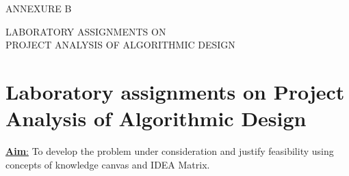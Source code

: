 \documentclass[12pt,a4paper]
{article}
\numberwithin{table}{section}
\begin{document}
{{{{{{{{{\begin{appendices}






\newpage
\begin{minipage}{15cm}


\vspace{4 in}
 \begin{center} 
\begin{Huge}

ANNEXURE B

\vspace{0.5 in}
\setlength{\baselineskip}{1\baselineskip}
{ LABORATORY ASSIGNMENTS ON \\
PROJECT ANALYSIS OF ALGORITHMIC DESIGN \\}
\end{Huge}

\end{center}
\end{minipage}


\newpage
\section{Laboratory assignments on Project Analysis of Algorithmic Design}


{\large \underline{\textbf{Aim}:}}  {To develop the problem under consideration and justify 
feasibility using concepts of knowledge canvas and IDEA Matrix}. 

\textunderscore \textunderscore \textunderscore \textunderscore 
\textunderscore \textunderscore \textunderscore \textunderscore 
\textunderscore \textunderscore \textunderscore \textunderscore 
\textunderscore \textunderscore \textunderscore \textunderscore 
\textunderscore \textunderscore \textunderscore \textunderscore 
\textunderscore \textunderscore \textunderscore \textunderscore 
\textunderscore \textunderscore \textunderscore \textunderscore 
\textunderscore \textunderscore \textunderscore \textunderscore 
\textunderscore \textunderscore \textunderscore \textunderscore 
\textunderscore \textunderscore \textunderscore \textunderscore 
\textunderscore \textunderscore \textunderscore \textunderscore 
\textunderscore \textunderscore \textunderscore \textunderscore 
\textunderscore \textunderscore \textunderscore \textunderscore 
\textunderscore \textunderscore \textunderscore \textunderscore 
\textunderscore \textunderscore \textunderscore \textunderscore 
\textunderscore \textunderscore \textunderscore \textunderscore 
\textunderscore \textunderscore \textunderscore \textunderscore 
\textunderscore \textunderscore \textunderscore \textunderscore 
\textunderscore \textunderscore \textunderscore 
\textunderscore \textunderscore \textunderscore \textunderscore 
\textunderscore \textunderscore \textunderscore
\\




\end{appendices}}}}}}}}}}
\end{document}
